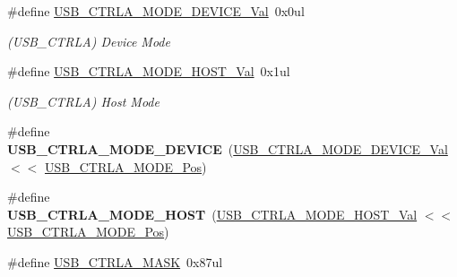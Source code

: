 \begin{DoxyCompactItemize}
\item 
\hypertarget{group___s_a_m_l21___u_s_b_ga4105f7a7046ef185465586b7e4a44909}{}\#define \hyperlink{group___s_a_m_l21___u_s_b_ga4105f7a7046ef185465586b7e4a44909}{U\+S\+B\+\_\+\+C\+T\+R\+L\+A\+\_\+\+M\+O\+D\+E\+\_\+\+D\+E\+V\+I\+C\+E\+\_\+\+Val}~0x0ul\label{group___s_a_m_l21___u_s_b_ga4105f7a7046ef185465586b7e4a44909}

\begin{DoxyCompactList}\small\item\em (U\+S\+B\+\_\+\+C\+T\+R\+L\+A) Device Mode \end{DoxyCompactList}\item 
\hypertarget{group___s_a_m_l21___u_s_b_gaedee7c0852094d9fcbd25760a4330ef3}{}\#define \hyperlink{group___s_a_m_l21___u_s_b_gaedee7c0852094d9fcbd25760a4330ef3}{U\+S\+B\+\_\+\+C\+T\+R\+L\+A\+\_\+\+M\+O\+D\+E\+\_\+\+H\+O\+S\+T\+\_\+\+Val}~0x1ul\label{group___s_a_m_l21___u_s_b_gaedee7c0852094d9fcbd25760a4330ef3}

\begin{DoxyCompactList}\small\item\em (U\+S\+B\+\_\+\+C\+T\+R\+L\+A) Host Mode \end{DoxyCompactList}\item 
\hypertarget{group___s_a_m_l21___u_s_b_gab7f4f04215759164d9addaf69f4a0a46}{}\#define {\bfseries U\+S\+B\+\_\+\+C\+T\+R\+L\+A\+\_\+\+M\+O\+D\+E\+\_\+\+D\+E\+V\+I\+C\+E}~(\hyperlink{group___s_a_m_l21___u_s_b_ga4105f7a7046ef185465586b7e4a44909}{U\+S\+B\+\_\+\+C\+T\+R\+L\+A\+\_\+\+M\+O\+D\+E\+\_\+\+D\+E\+V\+I\+C\+E\+\_\+\+Val}     $<$$<$ \hyperlink{group___s_a_m_l21___u_s_b_ga6261dc0af6c78b43e18d13ffeeccac0f}{U\+S\+B\+\_\+\+C\+T\+R\+L\+A\+\_\+\+M\+O\+D\+E\+\_\+\+Pos})\label{group___s_a_m_l21___u_s_b_gab7f4f04215759164d9addaf69f4a0a46}

\item 
\hypertarget{group___s_a_m_l21___u_s_b_ga9b5fe1075e16488679dcca361ed4b2f9}{}\#define {\bfseries U\+S\+B\+\_\+\+C\+T\+R\+L\+A\+\_\+\+M\+O\+D\+E\+\_\+\+H\+O\+S\+T}~(\hyperlink{group___s_a_m_l21___u_s_b_gaedee7c0852094d9fcbd25760a4330ef3}{U\+S\+B\+\_\+\+C\+T\+R\+L\+A\+\_\+\+M\+O\+D\+E\+\_\+\+H\+O\+S\+T\+\_\+\+Val}       $<$$<$ \hyperlink{group___s_a_m_l21___u_s_b_ga6261dc0af6c78b43e18d13ffeeccac0f}{U\+S\+B\+\_\+\+C\+T\+R\+L\+A\+\_\+\+M\+O\+D\+E\+\_\+\+Pos})\label{group___s_a_m_l21___u_s_b_ga9b5fe1075e16488679dcca361ed4b2f9}

\item 
\hypertarget{group___s_a_m_l21___u_s_b_ga27c6edc224dc16f34922ad28a3bfd107}{}\#define \hyperlink{group___s_a_m_l21___u_s_b_ga27c6edc224dc16f34922ad28a3bfd107}{U\+S\+B\+\_\+\+C\+T\+R\+L\+A\+\_\+\+M\+A\+S\+K}~0x87ul\label{group___s_a_m_l21___u_s_b_ga27c6edc224dc16f34922ad28a3bfd107}


\end{DoxyCompactItemize}
